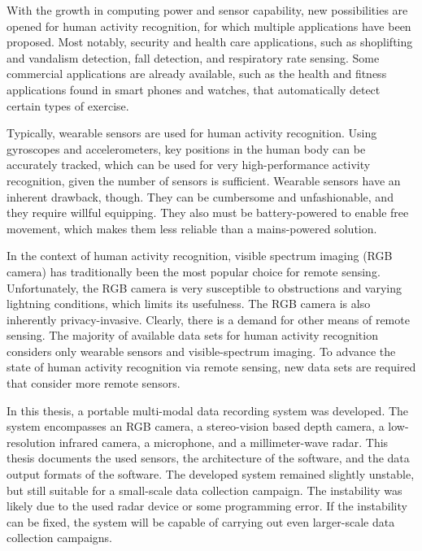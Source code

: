 With the growth in computing power and sensor capability,
new possibilities are opened for human activity recognition,
for which multiple applications have been proposed.
Most notably, security and health care applications,
such as shoplifting and vandalism detection, fall detection, and respiratory rate sensing.
Some commercial applications are already available,
such as the health and fitness applications found in smart phones and watches,
that automatically detect certain types of exercise.

Typically, wearable sensors are used for human activity recognition.
Using gyroscopes and accelerometers, key positions in the human body can be accurately tracked,
which can be used for very high-performance activity recognition,
given the number of sensors is sufficient.
Wearable sensors have an inherent drawback, though.
They can be cumbersome and unfashionable,
and they require willful equipping.
They also must be battery-powered to enable free movement,
which makes them less reliable than a mains-powered solution.

In the context of human activity recognition,
visible spectrum imaging (RGB camera) has traditionally been the most popular choice for remote sensing.
Unfortunately, the RGB camera is very susceptible to obstructions and varying lightning conditions,
which limits its usefulness.
The RGB camera is also inherently privacy-invasive.
Clearly, there is a demand for other means of remote sensing.
The majority of available data sets for human activity recognition considers only wearable sensors
and visible-spectrum imaging.
To advance the state of human activity recognition via remote sensing,
new data sets are required that consider more remote sensors.

In this thesis, a portable multi-modal data recording system was developed.
The system encompasses an RGB camera, a stereo-vision based depth camera,
a low-resolution infrared camera, a microphone, and a millimeter-wave radar.
This thesis documents the used sensors,
the architecture of the software,
and the data output formats of the software.
The developed system remained slightly unstable,
but still suitable for a small-scale data collection campaign.
The instability was likely due to the used radar device or some programming error.
If the instability can be fixed, the system will be capable of carrying out even larger-scale data collection campaigns.